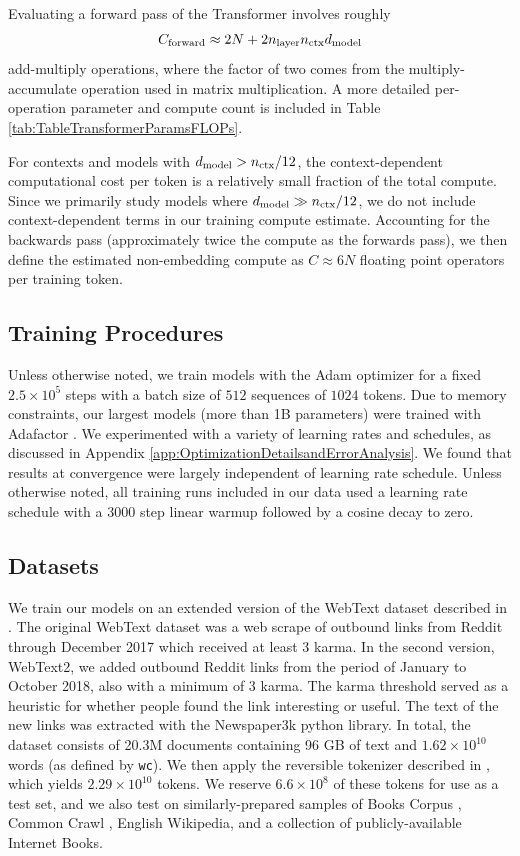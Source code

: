 \documentclass[english]{article}
\newcommand{\be}{\begin{equation}}
\newcommand{\ee}{\end{equation}}
\begin{document}
Evaluating a forward pass of the Transformer involves roughly
\be
\label{eq:ApproximateTotalCompute}
C_{\rm forward} \approx 2N + 2n_{{\rm layer}}n_{{\rm ctx}}d_{{\rm model}}
\ee
add-multiply operations, where the factor of two comes from the multiply-accumulate operation used in matrix multiplication.  A more detailed per-operation parameter and compute count is included in Table \ref{tab:TableTransformerParamsFLOPs}.

For contexts and models with $d_{{\rm model}} > n_{\rm ctx} / 12$, the context-dependent computational cost per token is a relatively small fraction of the total compute.
Since we primarily study models where $d_{\rm model} \gg n_{\rm ctx}/12$, we do not include context-dependent terms in our training compute estimate.  Accounting for the backwards pass (approximately twice the compute as the forwards pass), we then define the estimated non-embedding compute as $C \approx 6 N$ floating point operators per training token.


\subsection{Training Procedures}

Unless otherwise noted, we train  models with the Adam optimizer \cite{kingma2014adam} for a fixed $2.5 \times 10^5$  steps with a batch size of $512$ sequences of $1024$ tokens.
Due to memory constraints, our largest models (more than 1B parameters) were trained with Adafactor \cite{DBLP:journals/corr/abs-1804-04235}.
We experimented with a variety of learning rates and schedules, as discussed in Appendix \ref{app:OptimizationDetailsandErrorAnalysis}.
We found that results at convergence were largely independent of learning rate schedule.  Unless otherwise noted, all training runs included in our data used a learning rate schedule with a 3000 step linear warmup followed by a cosine decay to zero.

\subsection{Datasets}
We train our models on an extended version of the WebText dataset described in \cite{radford2019language}.  The original WebText dataset was a web scrape of outbound links from Reddit through December 2017 which received at least 3 karma. In the second version, WebText2, we added outbound Reddit links from the period of January to October 2018, also with a minimum of 3 karma. The karma threshold served as a heuristic for whether people found the link interesting or useful. The text of the new links was extracted with the Newspaper3k python library. In total, the dataset consists of 20.3M documents containing 96 GB of text and $1.62 \times 10^{10}$ words (as defined by \texttt{wc}). We then apply the reversible tokenizer described in \cite{radford2019language}, which yields $2.29 \times 10^{10}$ tokens.  We reserve $6.6 \times 10^{8}$ of these tokens for use as a test set, and we also test on similarly-prepared samples of Books Corpus \cite{Zhu_2015}, Common Crawl \cite{commoncrawl}, English Wikipedia, and a collection of publicly-available Internet Books.
\end{document}

